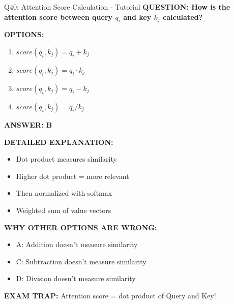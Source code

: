 \documentclass[8pt]{beamer}
\begin{document}
	\begin{frame}{Q40: Attention Score Calculation - Tutorial}
		\fontsize{6.5}{7.5}\selectfont
		\textbf{QUESTION: How is the attention score between query $q_i$ and key $k_j$ calculated?}
		
		\vspace{0.1cm}
		\textbf{OPTIONS:}
		\begin{enumerate}
			\item $score(q_i, k_j) = q_i + k_j$
			\item $score(q_i, k_j) = q_i \cdot k_j$
			\item $score(q_i, k_j) = q_i - k_j$
			\item $score(q_i, k_j) = q_i / k_j$
		\end{enumerate}
		
		\vspace{0.1cm}
		\textcolor{myblue}{\textbf{ANSWER: B}}
		
		\vspace{0.1cm}
		\textbf{DETAILED EXPLANATION:}
		\begin{itemize}
			\item Dot product measures similarity
			\item Higher dot product = more relevant
			\item Then normalized with softmax
			\item Weighted sum of value vectors
		\end{itemize}
		
		\vspace{0.1cm}
		\textcolor{myred}{\textbf{WHY OTHER OPTIONS ARE WRONG:}}
		\begin{itemize}
			\item \textcolor{myred}{A:} Addition doesn't measure similarity
			\item \textcolor{myred}{C:} Subtraction doesn't measure similarity
			\item \textcolor{myred}{D:} Division doesn't measure similarity
		\end{itemize}
		
		\textcolor{myred}{\textbf{EXAM TRAP:}} Attention score = \textcolor{myblue}{dot product of Query and Key}!
	\end{frame}
	
\end{document}
